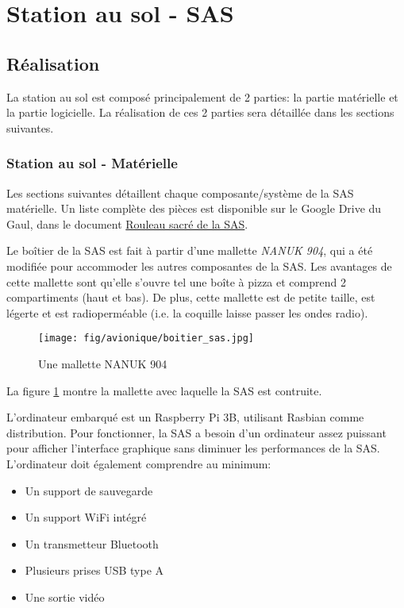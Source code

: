 \section{Station au sol - SAS}
\label{chap:sas}

\subsection{Réalisation}

La station au sol est composé principalement de 2 parties: la partie matérielle
et la partie logicielle. La réalisation de ces 2 parties sera détaillée dans
les sections suivantes.

\subsubsection{Station au sol - Matérielle}

Les sections suivantes détaillent chaque composante/système de la SAS
matérielle. Un liste complète des pièces est disponible sur le Google Drive du
Gaul, dans le document \href{https://drive.google.com/open?id=1WfV-Swc37Ih476rmRLYdwrBWRaUo8ZzXshS-LzYTQF4}{Rouleau sacré de la SAS}.


Le boîtier de la SAS est fait à partir d'une mallette \textit{NANUK 904}, qui a
été modifiée pour accommoder les autres composantes de la SAS. Les avantages de
cette mallette sont qu'elle s'ouvre tel une boîte à pizza et comprend 2
compartiments (haut et bas). De plus, cette mallette est de petite taille, est
légerte et est radioperméable (i.e. la coquille laisse passer les ondes radio).

\begin{figure}[H]
	\center
	\texttt{[image: fig/avionique/boitier\_sas.jpg]}
	\caption{Une mallette NANUK 904}
	\label{f:boitier_sas}
\end{figure}

La figure \ref{f:boitier_sas} montre la mallette avec laquelle la SAS est
contruite.


L'ordinateur embarqué est un Raspberry Pi 3B, utilisant Rasbian comme
distribution. Pour fonctionner, la SAS a besoin d'un ordinateur assez puissant
pour afficher l'interface graphique sans diminuer les performances de la SAS.
L'ordinateur doit également comprendre au minimum:

\begin{itemize}
	\item Un support de sauvegarde
	\item Un support WiFi intégré
	\item Un transmetteur Bluetooth
	\item Plusieurs prises USB type A
	\item Une sortie vidéo
\end{itemize}

